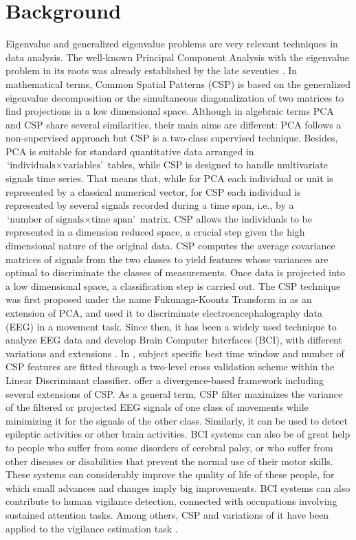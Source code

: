 \section{Background}
Eigenvalue and generalized eigenvalue problems are very relevant techniques in data analysis. The well-known Principal Component Analysis with the eigenvalue problem in its roots was already established by the late seventies \citep{mardia79}. In mathematical terms, Common Spatial Patterns (CSP) is based on the generalized eigenvalue decomposition or the simultaneous diagonalization of two matrices to find projections in a low dimensional space. Although in algebraic terms PCA and CSP share several similarities, their main aims are different: PCA follows a non-supervised approach but CSP is a two-class supervised technique. Besides, PCA is suitable for standard quantitative data arranged in  $\mbox{`individuals} \times \mbox{variables'}$ tables, while CSP is designed to handle multivariate signals time series. That means that, while for PCA each individual or unit is represented by a classical numerical vector, for CSP each individual  is represented by several signals recorded during a time span, i.e., by a $\mbox{`number of signals}\times \mbox{time span'}$ matrix. CSP allows  the individuals to be represented in a dimension reduced space, a crucial step given the high dimensional nature of the original data. CSP computes the average covariance matrices of signals from the two classes to yield features whose variances are optimal to discriminate the classes of measurements. Once data is projected into a low dimensional space, a classification step is carried out. The CSP technique was first proposed under the name Fukunaga-Koontz Transform in \cite{fukunaga70} as an extension of PCA, and \cite{MullerGerking99} used it to discriminate electroencephalography data (EEG) in a movement task. Since then, it has been a widely used technique to analyze EEG data and develop Brain Computer Interfaces (BCI), with different variations and extensions \citep{blankertz2007invariant,  blankertz07Optimizing, grosse_wentrup08, Lotte11, wang12, astigarraga16, darvish21}.  In \cite{wu2013common}, subject specific best time window and number of CSP features are fitted through a two-level cross validation scheme within the Linear Discriminant classifier. \cite{samek14} offer a divergence-based framework  including several extensions of CSP. As a general term, CSP filter maximizes the variance of the filtered or projected EEG signals of one class of movements while minimizing it for the signals of the other class. Similarly, it can be used to detect epileptic activities \cite{khalid16} or other brain activities. BCI systems can also be of great help to people who suffer from some disorders of cerebral palsy, or who suffer from other diseases or disabilities that prevent the normal use of their motor skills. These systems can considerably improve the quality of life of these people, for which small advances and changes imply big improvements. BCI systems can also contribute to human vigilance detection, connected with occupations involving sustained attention tasks. Among others, CSP and variations of it have been applied to the vigilance estimation task \citep{yu19AGeneral}. 

